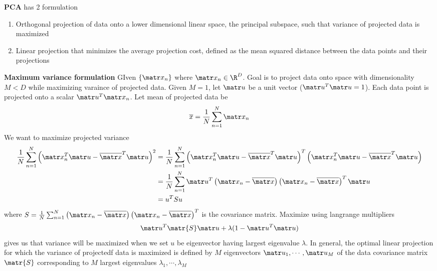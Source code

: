 \documentclass[11pt]{article}
\begin{document}


\begin{defn*}
    \textbf{PCA} has 2 formulation
    \begin{enumerate}
        \item Orthogonal projection of data onto a lower dimensional linear space, the principal subspace, such that variance of projected data is maximized
        \item Linear projection that minimizes the average projection cost, defined as the mean squared distance between the data points and their projections
    \end{enumerate}
\end{defn*}

\begin{defn*}
    \textbf{Maximum variance formulation} GIven $\{\bx_n\}$ where $\bx_n \in \R^D$. Goal is to project data onto space with dimensionality $M < D$ while maximizing varaince of projected data. Given $M=1$, let $\bu$ be a unit vector ($\bu^T \bu = 1$). Each data point is projected onto a scalar $\bu^T \bx_n$. Let mean of projected data be 
    \[
        \overline{x} = \frac{1}{N} \sum_{n=1}^N \bx_n    
    \]
    We want to maximize projected variance 
    \begin{align*}
        \frac{1}{N} \sum_{n=1}^N \left( \bx_n^T \bu - \overline{\bx}^T \bu \right)^2
        &= \frac{1}{N} \sum_{n=1}^N \left( \bx_n^T \bu - \overline{\bx}^T \bu \right)^T \left( \bx_n^T \bu - \overline{\bx}^T \bu \right) \\ 
        &= \frac{1}{N} \sum_{n=1}^N \bu^T \left( \bx_n - \overline{\bx} \right) \left( \bx_n - \overline{\bx}  \right)^T \bu \\ 
        &= u^T S u 
    \end{align*}
    where $\textstyle S = \frac{1}{N} \sum_{n=1}^N \left( \bx_n - \overline{\bx} \right) \left( \bx_n - \overline{\bx}  \right)^T$ is the covariance matrix. Maximize using langrange multipliers 
    \[
        \bu^T \matr{S} \bu + \lambda (1 - \bu^T \bu)    
    \]
    gives us that variance will be maximized when we set $u$ be eigenvector having largest eigenvalue $\lambda$. In general, the optimal linear projection for which the variance of projectedf data is maximized is defined by $M$ eigenvectors $\bu_1, \cdots, \bu_M$ of the data covariance matrix $\matr{S}$ corresponding to $M$ largest eigenvalues $\lambda_1, \cdots, \lambda_M$ 
\end{defn*}
\end{document}
